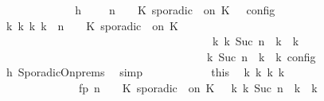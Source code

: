 \begin{isabellebody}
\ {\isacharminus}\isanewline
\ \ \ \ \ \ \ \ \ \ \isamarkupfalse%
\ h{}{\isacharcolon}\ {\isacartoucheopen}{\isasymrho}\ {\isasymin}\ {\isasymlbrakk}\ {\isasymGamma}{\isacharcomma}\ n\ {\isasymturnstile}\ {\isasymPsi}\ {\isasymtriangleright}\ {\isacharparenleft}{\isacharparenleft}K\ sporadic\ {\isasymtau}\ on\ K\ {\isacharhash}\ {\isasymPhi}{\isacharparenright}\ {\isasymrbrakk}\isactrlsub c\isactrlsub o\isactrlsub n\isactrlsub f\isactrlsub i\isactrlsub g{\isacartoucheclose}\isanewline
\ \ \ \ \ \ \ \ \ \ \isamarkupfalse%
\ {\isacartoucheopen}{\isasymexists}{\isasymGamma}\isactrlsub k\ {\isasymPsi}\isactrlsub k\ {\isasymPhi}\isactrlsub k\ k{\isachardot}\ {\isacharparenleft}{\isacharparenleft}{\isasymGamma}{\isacharcomma}\ n\ {\isasymturnstile}\ {\isasymPsi}\ {\isasymtriangleright}\ {\isacharparenleft}{\isacharparenleft}K\ sporadic\ {\isasymtau}\ on\ K\ {\isacharhash}\ {\isasymPhi}{\isacharparenright}{\isacharparenright}\isanewline
\ \ \ \ \ \ \ \ \ \ \ \ \ \ \ \ \ \ \ \ \ \ \ \ \ \ \ \ \ \ \ \ \ \ \ \ \ \ {\isasymhookrightarrow}\isactrlbsup k\isactrlesup \ {\isacharparenleft}{\isasymGamma}\isactrlsub k{\isacharcomma}\ Suc\ n\ {\isasymturnstile}\ {\isasymPsi}\isactrlsub k\ {\isasymtriangleright}\ {\isasymPhi}\isactrlsub k{\isacharparenright}{\isacharparenright}\isanewline
\ \ \ \ \ \ \ \ \ \ \ \ \ \ \ \ \ \ \ \ \ \ \ \ \ \ \ \ \ \ \ \ \ {\isasymand}\ {\isacharparenleft}{\isasymrho}\ {\isasymin}\ {\isasymlbrakk}\ {\isasymGamma}\isactrlsub k{\isacharcomma}\ Suc\ n\ {\isasymturnstile}\ {\isasymPsi}\isactrlsub k\ {\isasymtriangleright}\ {\isasymPhi}\isactrlsub k\ {\isasymrbrakk}\isactrlsub c\isactrlsub o\isactrlsub n\isactrlsub f\isactrlsub i\isactrlsub g{\isacharparenright}{\isacartoucheclose}\isanewline
\ \ \ \ \ \ \ \ \ \ \ \ \isamarkupfalse%
\ h{}\ SporadicOn{\isachardot}prems\ \isamarkupfalse%
\ simp\isanewline
\ \ \ \ \ \ \ \ \ \ \isamarkupfalse%
\ this\ \isamarkupfalse%
\ {\isasymGamma}\isactrlsub k\ {\isasymPsi}\isactrlsub k\ {\isasymPhi}\isactrlsub k\ k\ \isanewline
\ \ \ \ \ \ \ \ \ \ \ \ \ \ fp{\isacharcolon}{\isacartoucheopen}{\isacharparenleft}{\isacharparenleft}{\isasymGamma}{\isacharcomma}\ n\ {\isasymturnstile}\ {\isasymPsi}\ {\isasymtriangleright}\ {\isacharparenleft}{\isacharparenleft}K\ sporadic\ {\isasymtau}\ on\ K\ {\isacharhash}\ {\isasymPhi}{\isacharparenright}{\isacharparenright}\ {\isasymhookrightarrow}\isactrlbsup k\isactrlesup \ {\isacharparenleft}{\isasymGamma}\isactrlsub k{\isacharcomma}\ Suc\ n\ {\isasymturnstile}\ {\isasymPsi}\isactrlsub k\ {\isasymtriangleright}\ {\isasymPhi}\isactrlsub k{\isacharparenright}{\isacharparenright}\isanewline

\end{isabellebody}
